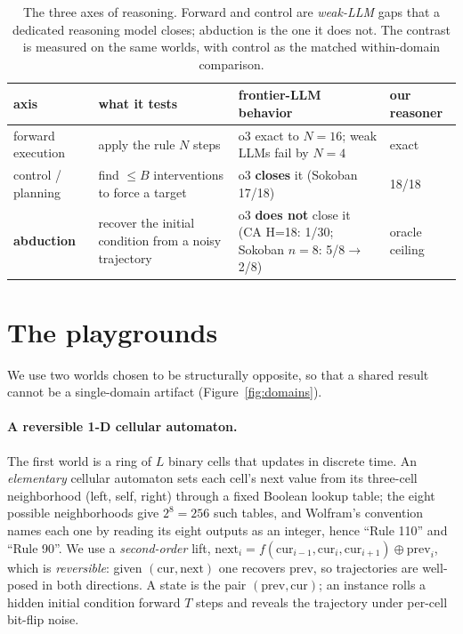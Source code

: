 \documentclass{article}
\begin{document}
\begin{table}[t]
\centering
\caption{The three axes of reasoning. Forward and control are \emph{weak-LLM} gaps that a
dedicated reasoning model closes; abduction is the one it does not. The contrast is measured
on the same worlds, with control as the matched within-domain comparison.}
\label{tab:axes}
\begin{tabular}{@{}p{2.2cm}p{4.3cm}p{3.9cm}p{2.3cm}@{}}
\toprule
axis & what it tests & frontier-LLM behavior & our reasoner \\
\midrule
forward execution & apply the rule $N$ steps & o3 exact to $N{=}16$; weak LLMs fail by $N{=}4$ & exact \\
control / planning & find $\leq B$ interventions to force a target & o3 \textbf{closes} it (Sokoban 17/18) & 18/18 \\
\textbf{abduction} & recover the initial condition from a noisy trajectory & o3 \textbf{does not} close it (CA H=18: 1/30; Sokoban $n{=}8$: 5/8$\rightarrow$2/8) & oracle ceiling \\
\bottomrule
\end{tabular}
\end{table}

\section{The playgrounds}
\label{sec:domains}

We use two worlds chosen to be structurally opposite, so that a shared result cannot be a
single-domain artifact (Figure~\ref{fig:domains}).

\paragraph{A reversible 1-D cellular automaton.}
The first world is a ring of $L$ binary cells that updates in discrete time. An \emph{elementary}
cellular automaton sets each cell's next value from its three-cell neighborhood (left, self, right)
through a fixed Boolean lookup table; the eight possible neighborhoods give $2^8 = 256$ such tables,
and Wolfram's convention names each one by reading its eight outputs as an integer, hence ``Rule
110'' and ``Rule 90''. We use a \emph{second-order} lift, $\text{next}_i =
f(\text{cur}_{i-1},\text{cur}_i,\text{cur}_{i+1}) \oplus \text{prev}_i$, which is \emph{reversible}:
given $(\text{cur},\text{next})$ one recovers $\text{prev}$, so trajectories are well-posed in both
directions. A state is the pair $(\text{prev},\text{cur})$; an instance rolls a hidden initial
condition forward $T$ steps and reveals the trajectory under per-cell bit-flip noise.
\end{document}
